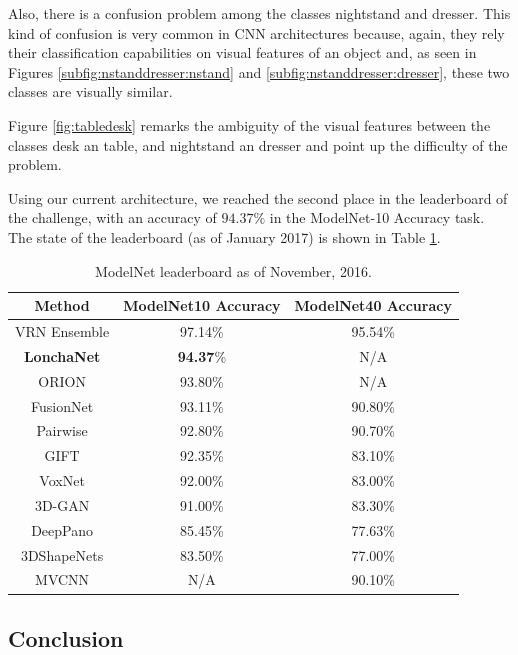 Also, there is a confusion problem among the classes nightstand and dresser. This kind of confusion is very common in \acs{CNN} architectures because, again, they rely their classification capabilities on visual features of an object and, as seen in Figures \ref{subfig:nstanddresser:nstand} and \ref{subfig:nstanddresser:dresser}, these two classes are visually similar.

Figure \ref{fig:tabledesk} remarks the ambiguity of the visual features between the classes desk an table, and nightstand an dresser and point up the difficulty of the problem.

Using our current architecture, we reached the second place in the leaderboard of the challenge, with an accuracy of $94.37\%$ in the ModelNet-10 Accuracy task. The state of the leaderboard (as of January 2017) is shown in Table \ref{table:modelnet_leaderboard}.

\begin{table}[!b]
	\centering
	\begin{tabular}{ccc}
    	Method & ModelNet10 Accuracy & ModelNet40 Accuracy\\
        \hline
        VRN Ensemble \cite{Brock2016} & 97.14\% & 95.54\%\\
        \textbf{LonchaNet} & \textbf{94.37}\% & N/A\\
        ORION \cite{Sedaghat2016} & 93.80\% & N/A\\
        FusionNet \cite{Hegde2016} & 93.11\% & 90.80\% \\
        Pairwise \cite{Johns2016} & 92.80\% & 90.70\% \\
        GIFT \cite{Bai2016} & 92.35\% & 83.10\% \\
        VoxNet \cite{Maturana2015} & 92.00\% & 83.00\% \\
        3D-GAN \cite{Wu2016} & 91.00\% & 83.30\% \\
        DeepPano \cite{Shi2015} & 85.45\% & 77.63\% \\
        3DShapeNets \cite{Wu2015} & 83.50\% & 77.00\% \\
        MVCNN \cite{Su2015} & N/A & 90.10\% \\
        \hline
    \end{tabular}
    \caption{ModelNet leaderboard as of November, 2016.}
    \label{table:modelnet_leaderboard}
\end{table}

\subsection{Conclusion}
\label{cha:objrecog:sec:lonchanet:subsec:conclusion}

